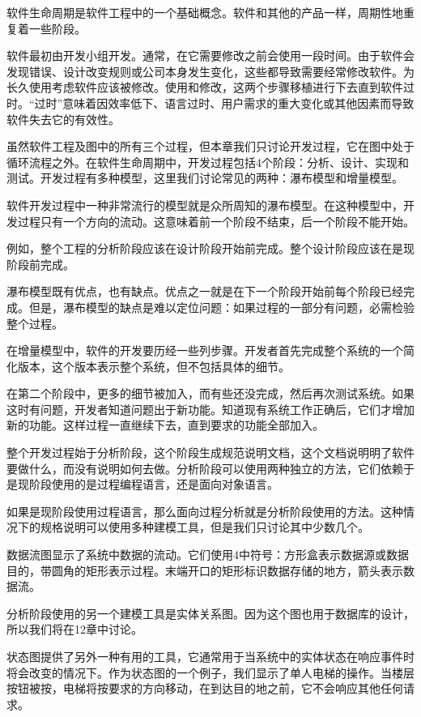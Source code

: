 
软件生命周期是软件工程中的一个基础概念。软件和其他的产品一样，周期性地重复着一些阶段。

软件最初由开发小组开发。通常，在它需要修改之前会使用一段时间。由于软件会发现错误、设计改变规则或公司本身发生变化，这些都导致需要经常修改软件。为长久使用考虑软件应该被修改。使用和修改，这两个步骤移植进行下去直到软件过时。“过时”意味着因效率低下、语言过时、用户需求的重大变化或其他因素而导致软件失去它的有效性。

虽然软件工程及图中的所有三个过程，但本章我们只讨论开发过程，它在图中处于循环流程之外。在软件生命周期中，开发过程包括4个阶段：分析、设计、实现和测试。开发过程有多种模型，这里我们讨论常见的两种：瀑布模型和增量模型。

软件开发过程中一种非常流行的模型就是众所周知的瀑布模型。在这种模型中，开发过程只有一个方向的流动。这意味着前一个阶段不结束，后一个阶段不能开始。

例如，整个工程的分析阶段应该在设计阶段开始前完成。整个设计阶段应该在是现阶段前完成。

瀑布模型既有优点，也有缺点。优点之一就是在下一个阶段开始前每个阶段已经完成。但是，瀑布模型的缺点是难以定位问题：如果过程的一部分有问题，必需检验整个过程。

在增量模型中，软件的开发要历经一些列步骤。开发者首先完成整个系统的一个简化版本，这个版本表示整个系统，但不包括具体的细节。

在第二个阶段中，更多的细节被加入，而有些还没完成，然后再次测试系统。如果这时有问题，开发者知道问题出于新功能。知道现有系统工作正确后，它们才增加新的功能。这样过程一直继续下去，直到要求的功能全部加入。

整个开发过程始于分析阶段，这个阶段生成规范说明文档，这个文档说明明了软件要做什么，而没有说明如何去做。分析阶段可以使用两种独立的方法，它们依赖于是现阶段使用的是过程编程语言，还是面向对象语言。

如果是现阶段使用过程语言，那么面向过程分析就是分析阶段使用的方法。这种情况下的规格说明可以使用多种建模工具，但是我们只讨论其中少数几个。

数据流图显示了系统中数据的流动。它们使用4中符号：方形盒表示数据源或数据目的，带圆角的矩形表示过程。末端开口的矩形标识数据存储的地方，箭头表示数据流。

分析阶段使用的另一个建模工具是实体关系图。因为这个图也用于数据库的设计，所以我们将在12章中讨论。

状态图提供了另外一种有用的工具，它通常用于当系统中的实体状态在响应事件时将会改变的情况下。作为状态图的一个例子，我们显示了单人电梯的操作。当楼层按钮被按，电梯将按要求的方向移动，在到达目的地之前，它不会响应其他任何请求。

